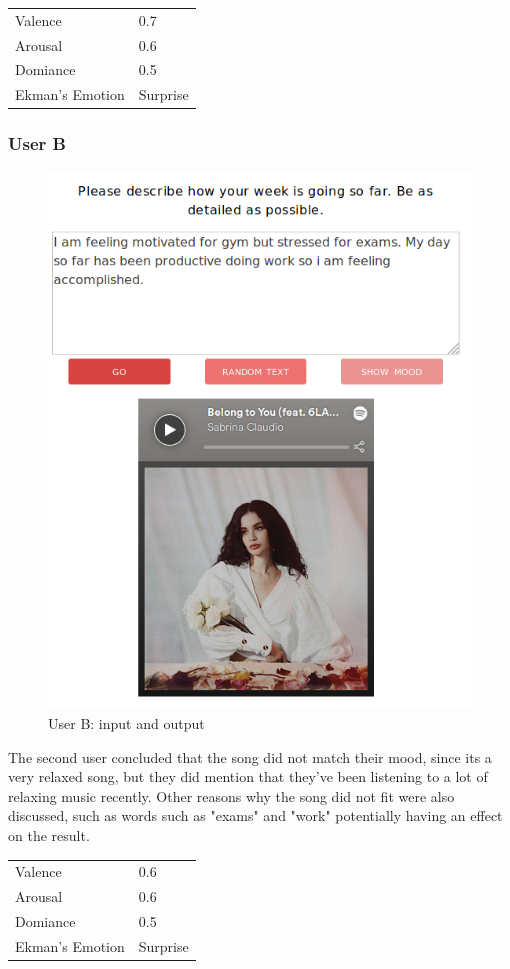 \begin{table}[h]
\centering
\begin{tabular}{|l|l|}
\hline
 Valence &  0.7\\
 Arousal &  0.6\\
 Domiance &  0.5\\
 Ekman's Emotion &  Surprise\\ \hline
\end{tabular}
\end{table}

\subsubsection{User B}

\begin{figure}[h]
\centering
\includegraphics[scale=0.4]{implementation/jana.png}
\caption{User B: input and output}
\label{user:2}
\end{figure}

The second user concluded that the song did not match their mood, since its a very relaxed song, but they did mention that they've been listening to a lot of relaxing music recently. Other reasons why the song did not fit were also discussed, such as words such as "exams" and "work" potentially having an effect on the result.

\begin{table}[h]
\centering
\begin{tabular}{|l|l|}
\hline
 Valence &  0.6\\
 Arousal &  0.6\\
 Domiance &  0.5\\
 Ekman's Emotion &  Surprise\\ \hline
\end{tabular}
\end{table}

